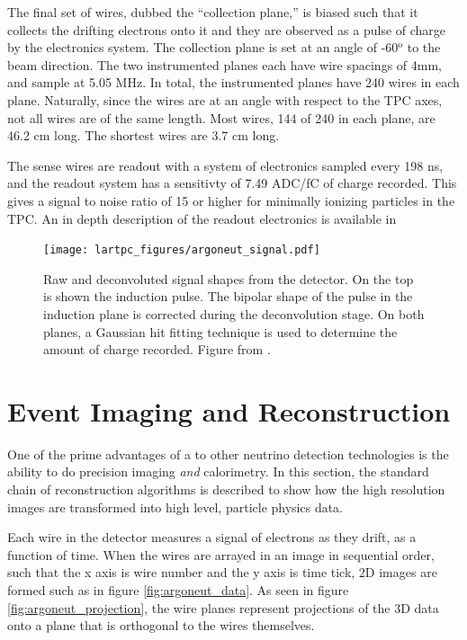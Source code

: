 The final set of wires, dubbed the ``collection plane,'' is biased such that it collects the drifting electrons onto it and they are observed as a pulse of charge by the electronics system.  The collection plane is set at an angle of -60$^\text{o}$ to the beam direction.  The two instrumented planes each have wire spacings of 4mm, and sample at 5.05 MHz.  In total, the instrumented planes have 240 wires in each plane.  Naturally, since the wires are at an angle with respect to the TPC axes, not all wires are of the same length.  Most wires, 144 of 240 in each plane, are 46.2 cm long.  The shortest wires are 3.7 cm long.

The sense wires are readout with a system of electronics sampled every 198 ns, and the readout system has a sensitivty of 7.49 ADC/fC of charge recorded.  This gives a signal to noise ratio of 15 or higher for minimally ionizing particles in the TPC.  An in depth description of the \argoneut readout electronics is available in \cite{Anderson:2012vc}


\begin{figure}[htbp]
  \centering
  \texttt{[image: lartpc\_figures/argoneut\_signal.pdf]}
  \caption[Deconvolution of \argoneut Signals]{Raw and deconvoluted signal shapes from the \argoneut detector.  On the top is shown the induction pulse.  The bipolar shape of the pulse in the induction plane is corrected during the deconvolution stage.  On both planes, a Gaussian hit fitting technique is used to determine the amount of charge recorded. Figure from \cite{Anderson:2012vc}.}
  \label{fig:argoneut_signals}
\end{figure}

\section{\label{sec:lartpc_reconstruction} Event Imaging and Reconstruction}

One of the prime advantages of a \lartpc to other neutrino detection technologies is the ability to do precision imaging {\em and} calorimetry.  In this section, the standard chain of reconstruction algorithms is described to show how the high resolution images are transformed into high level, particle physics data.

Each wire in the detector measures a signal of electrons as they drift, as a function of time.  When the wires are arrayed in an image in sequential order, such that the x axis is wire number and the y axis is time tick, 2D images are formed such as in figure \ref{fig:argoneut_data}.  As seen in figure \ref{fig:argoneut_projection}, the wire planes represent projections of the 3D data onto a plane that is orthogonal to the wires themselves.

